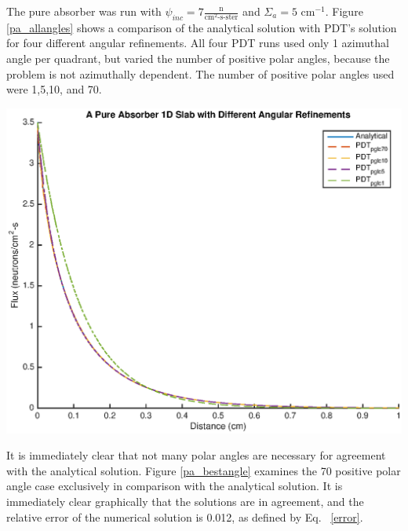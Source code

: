 The pure absorber was run with $\psi_{inc} = 7 \frac{\text{n}}{\text{cm}^2\text{-s-ster}}$ and $\Sigma_a = 5 \text{ cm}^{-1}$. Figure \ref{pa_allangles} shows a comparison of the analytical solution with PDT's solution for four different angular refinements. All four PDT runs used only 1 azimuthal angle per quadrant, but varied the number of positive polar angles, because the problem is not azimuthally dependent. The number of positive polar angles used were 1,5,10, and 70. 

\noindent\begin{minipage}{\textwidth}
\centering
\includegraphics[scale = 0.8]{figures/PureAbsorberAllAngles.eps}
\label{pa_allangles}
\end{minipage}
\smallskip

It is immediately clear that not many polar angles are necessary for agreement with the analytical solution. Figure \ref{pa_bestangle} examines the 70 positive polar angle case exclusively in comparison with the analytical solution. It is immediately clear graphically that the solutions are in agreement, and the relative error of the numerical solution is 0.012, as defined by Eq. ~\eqref{error}.

